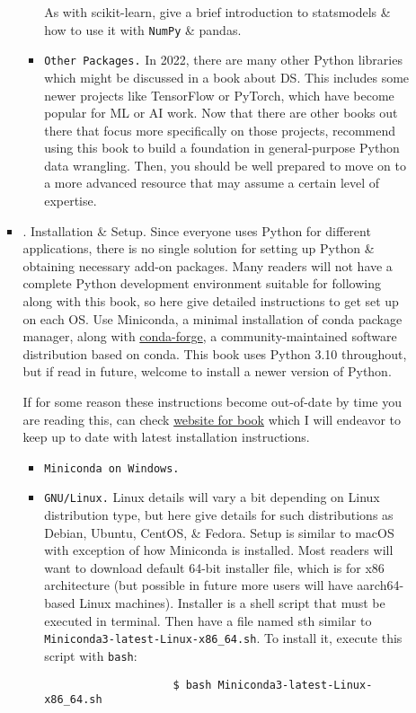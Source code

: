 \documentclass{article}
\begin{document}
\begin{enumerate}
\begin{itemize}
\begin{itemize}
\begin{itemize}
				As with scikit-learn, give a brief introduction to statsmodels \& how to use it with {\tt NumPy} \& pandas.
				\item {\tt Other Packages.} In 2022, there are many other Python libraries which might be discussed in a book about DS. This includes some newer projects like TensorFlow or PyTorch, which have become popular for ML or AI work. Now that there are other books out there that focus more specifically on those projects, recommend using this book to build a foundation in general-purpose Python data wrangling. Then, you should be well prepared to move on to a more advanced resource that may assume a certain level of expertise.
			\end{itemize}
			\item {. Installation \& Setup.} Since everyone uses Python for different applications, there is no single solution for setting up Python \& obtaining necessary add-on packages. Many readers will not have a complete Python development environment suitable for following along with this book, so here give detailed instructions to get set up on each OS. Use Miniconda, a minimal installation of conda package manager, along with \href{https://conda-forge.org}{conda-forge}, a community-maintained software distribution based on conda. This book uses Python 3.10 throughout, but if read in future, welcome to install a newer version of Python.
			
			If for some reason these instructions become out-of-date by time you are reading this, can check \href{https://wesmckinney.com/book}{website for book} which I will endeavor to keep up to date with latest installation instructions.
			\begin{itemize}
				\item {\tt Miniconda on Windows.}
				\item {\tt GNU{\tt/}Linux.} Linux details will vary a bit depending on Linux distribution type, but here give details for such distributions as Debian, Ubuntu, CentOS, \& Fedora. Setup is similar to macOS with exception of how Miniconda is installed. Most readers will want to download default 64-bit installer file, which is for x86 architecture (but possible in future more users will have aarch64-based Linux machines). Installer is a shell script that must be executed in terminal. Then have a file named sth similar to \verb|Miniconda3-latest-Linux-x86_64.sh|. To install it, execute this script with {\tt bash}:
				\begin{verbatim}
					$ bash Miniconda3-latest-Linux-x86_64.sh
				\end{verbatim}
				

\end{itemize}
\end{itemize}
\end{itemize}
\end{enumerate}
\end{document}
